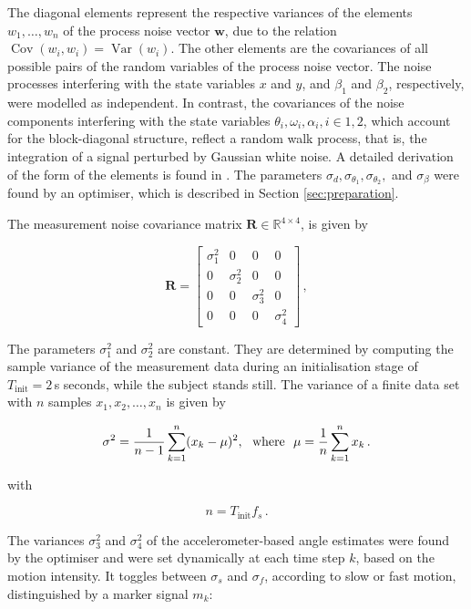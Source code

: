 \noindent
The diagonal elements represent the respective variances of the elements $w_1, \dots, w_n$ of the process noise vector $\mathbf{w}$, due to the relation $\operatorname{Cov}(w_i,w_i) = \operatorname{Var}(w_i)$. The other elements are the covariances of all possible pairs of the random variables of the process noise vector. The noise processes interfering with the state variables $x$ and $y$, and $\beta_1$ and $\beta_2$, respectively, were modelled as independent. In contrast, the covariances of the noise components interfering with the state variables $\theta_i, \omega_i, \alpha_i, i \in {1, 2}$, which account for the block-diagonal structure, reflect a random walk process, that is, the integration of a signal perturbed by Gaussian white noise. A detailed derivation of the form of the elements is found in \cite{Kelly_1994_random}. The parameters $\sigma_d, \sigma_{\theta_1}, \sigma_{\theta_2},$ and $\sigma_{\beta}$ were found by an optimiser, which is described in Section \ref{sec:preparation}.

The measurement noise covariance matrix $\mathbf{R} \in \mathbb{R}^{4 \times 4}$, is given by

\begin{equation}
\mathbf{R} = \begin{bmatrix}
  \sigma^2_1 & 0 & 0 & 0\\
  0 & \sigma^2_2 & 0 & 0\\
  0 & 0 & \sigma^2_3 & 0\\
  0 & 0 & 0 & \sigma^2_4
\end{bmatrix}\,,
\end{equation}

The parameters $\sigma^2_1$ and $\sigma^2_2$ are constant. They are determined by computing the sample variance of the measurement data during an initialisation stage of $T_{\text{init}} = 2$\,s seconds, while the subject stands still. The variance of a finite data set with $n$ samples $x_1, x_2, \dots, x_n$ is given by

\begin{equation}
  \sigma^2 = \frac{1}{n-1} \sum_{k=1}^n (x_k - \mu)^2, {\rm \ \ where\ \ } \mu = \frac{1}{n} \sum_{k=1}^n x_k\,.
\end{equation}

\noindent
with

\begin{equation}
  n = T_{\text{init}} f_s\,.
\end{equation}


\noindent
The variances $\sigma^2_3$ and $\sigma^2_4$ of the accelerometer-based angle estimates were found by the optimiser and were set dynamically at each time step $k$, based on the motion intensity. It toggles between $\sigma_s$ and $\sigma_f$, according to slow or fast motion, distinguished by a marker signal $m_k$:

